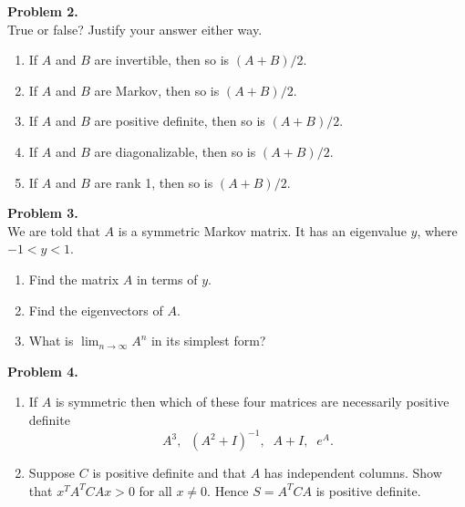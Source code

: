 \documentclass[11pt]{article}
\begin{document}
\newpage

\noindent \textbf{Problem 2.}\\
True or false? Justify your answer either way.
\begin{enumerate}
\item If $A$ and $B$ are invertible, then so is $(A+B)/2$.
\item If $A$ and $B$ are Markov, then so is $(A+B)/2$.
\item If $A$ and $B$ are positive definite, then so is $(A+B)/2$.
\item If $A$ and $B$ are diagonalizable, then so is $(A+B)/2$.
\item If $A$ and $B$ are rank 1, then so is $(A+B)/2$.
\end{enumerate}

\vskip 180pt 

\noindent \textbf{Problem 3.}\\
We are told that $A$ is a symmetric Markov matrix. It has an eigenvalue $y$, where $-1<y<1$. 
\begin{enumerate}
\item Find the matrix $A$ in terms of $y$. 
\item Find the eigenvectors of $A$.
\item What is $\lim_{n\to\infty} A^n$ in its simplest form?
\end{enumerate}

\newpage

\noindent \textbf{Problem 4.}\\
\begin{enumerate}
\item If $A$ is symmetric then which of these four matrices are necessarily positive definite
$$A^3, \;\; (A^2+I)^{-1}, \;\; A+I, \;\; e^A.$$
\item Suppose $C$ is positive definite and that $A$ has independent columns. Show that $x^TA^TCAx > 0$ for all $x\neq 0$. Hence $S = A^TCA$ is positive definite. 
\end{enumerate}
\end{document}
